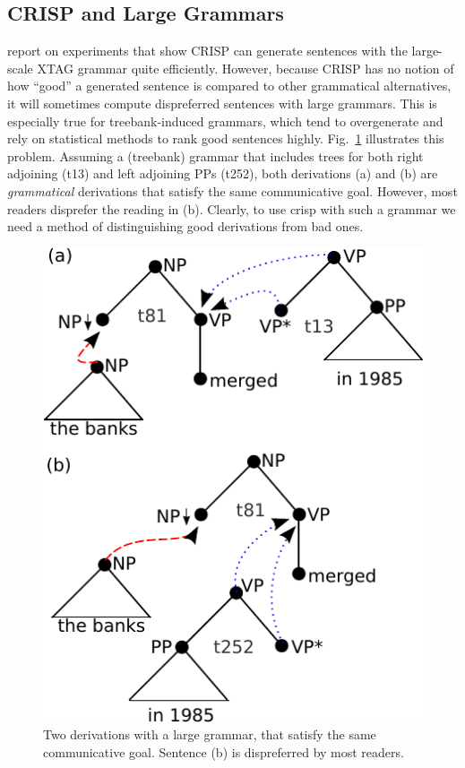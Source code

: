 \subsection{CRISP and Large Grammars}

 report on experiments that show CRISP can generate sentences with the large-scale XTAG grammar \cite{xtag2001} quite efficiently.  However, because CRISP has no notion of how ``good'' a generated sentence is compared to other grammatical alternatives, it will sometimes compute dispreferred sentences with large grammars.  This is especially true for treebank-induced grammars, which tend to overgenerate and rely on statistical methods to rank good sentences highly.  Fig.~\ref{fig:overgen} illustrates this problem.  Assuming a (treebank) grammar that includes trees for both right adjoining (t13) and left adjoining PPs (t252), both derivations (a) and (b) are {\it grammatical} derivations that satisfy the same communicative goal. However, most readers disprefer the reading in (b).  Clearly, to use {\sc crisp} with such a grammar we need a method of distinguishing good derivations from bad ones. 


\begin{figure}
\begin{center}
\includegraphics[width=.3\textwidth]{figures/overgen.pdf}
\caption{\label{fig:overgen} Two derivations with a large grammar, that satisfy the same communicative goal. Sentence (b) is dispreferred by most readers.}
\end{center}
\end{figure} 


